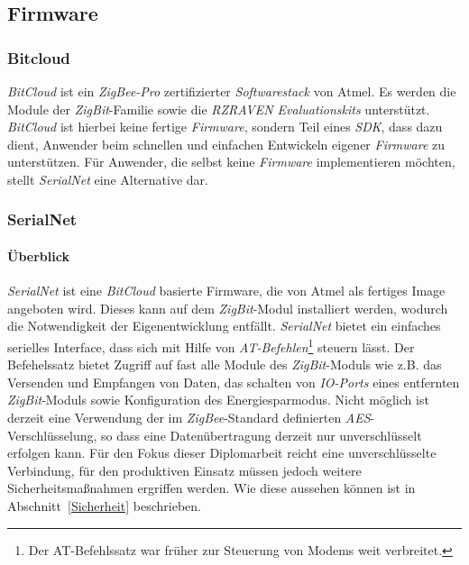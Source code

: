    \subsection{Firmware}
        \subsubsection{Bitcloud}
            \emph{BitCloud}  ist ein \emph{ZigBee-Pro} zertifizierter \emph{Softwarestack} von Atmel. Es werden die 
            Module der \emph{ZigBit}-Familie
            sowie die \emph{RZRAVEN Evaluationskits} unterstützt. \emph{BitCloud} ist hierbei keine fertige
            \emph{Firmware}, sondern 
            Teil eines \emph{SDK}, dass dazu dient, Anwender beim schnellen und einfachen Entwickeln eigener 
            \emph{Firmware} zu unterstützen. Für Anwender, die selbst keine \emph{Firmware} implementieren möchten, 
            stellt \emph{SerialNet} eine Alternative dar.

        \subsubsection{SerialNet}

            \paragraph{Überblick}

                \emph{SerialNet} ist eine \emph{BitCloud} basierte Firmware, die von Atmel als fertiges Image angeboten
                wird. Dieses kann auf dem \emph{ZigBit}-Modul installiert werden, wodurch die Notwendigkeit der 
                Eigenentwicklung entfällt. \emph{SerialNet} bietet ein einfaches serielles Interface, dass sich mit
                Hilfe von \emph{AT-Befehlen}\footnote{Der AT-Befehlssatz war früher zur Steuerung von Modems weit 
                verbreitet.} 
                steuern lässt. Der Befehelssatz bietet Zugriff auf fast alle Module des \emph{ZigBit}-Moduls wie z.B. das
                Versenden und Empfangen von Daten, das schalten von \emph{IO-Ports} eines entfernten 
                \emph{ZigBit}-Moduls sowie
                Konfiguration des Energiesparmodus. Nicht möglich ist derzeit eine Verwendung der im \emph{ZigBee}-Standard
                definierten \emph{AES}-Verschlüsselung, so dass eine Datenübertragung derzeit nur 
                unverschlüsselt erfolgen kann.
                Für den Fokus dieser Diplomarbeit reicht eine unverschlüsselte Verbindung, für den produktiven Einsatz
                müssen jedoch weitere Sicherheitsmaßnahmen ergriffen werden. Wie diese aussehen können ist in 
                Abschnitt~\ref{Sicherheit} beschrieben. 

